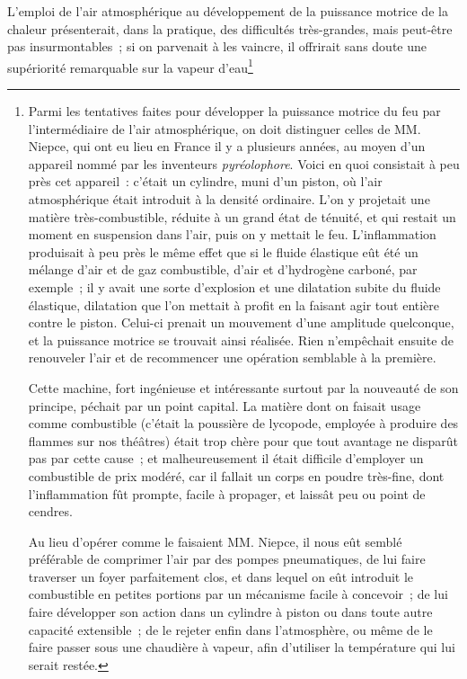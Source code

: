 \documentclass[french,twoside]{book} %
\begin{document}
\noindent L’emploi de l’air atmosphérique au développement de la puissance motrice de la chaleur présenterait, dans la pratique, des difficultés très-grandes, mais peut-être pas insurmontables ; si on parvenait à les vaincre, il offrirait sans doute une supériorité remarquable sur la vapeur d’eau\footnote{ \noindent Parmi les tentatives faites pour développer la puissance motrice du feu par l’intermédiaire de l’air atmosphérique, on doit distinguer celles de MM. Niepce, qui ont eu lieu en France il y a plusieurs années, au moyen d’un appareil nommé par les inventeurs \emph{pyréolophore}. Voici en quoi consistait à peu près cet appareil : c’était un cylindre, muni d’un piston, où l’air atmosphérique était introduit à la densité ordinaire. L’on y projetait une matière très-combustible, réduite à un grand état de ténuité, et qui restait un moment en suspension dans l’air, puis on y mettait le feu. L’inflammation produisait à peu près le même effet que si le fluide élastique eût été un mélange d’air et de gaz combustible, d’air et d’hydrogène carboné, par exemple ; il y avait une sorte d’explosion et une dilatation subite du fluide élastique, dilatation que l’on mettait à profit en la faisant agir tout entière contre le piston. Celui-ci prenait un mouvement d’une amplitude quelconque, et la puissance motrice se trouvait ainsi réalisée. Rien n’empêchait ensuite de renouveler l’air et de recommencer une opération semblable à la première.\par
 Cette machine, fort ingénieuse et intéressante surtout par la nouveauté de son principe, péchait par un point capital. La matière dont on faisait usage comme combustible (c’était la poussière de lycopode, employée à produire des flammes sur nos théâtres) était trop chère pour que tout avantage ne disparût pas par cette cause ; et malheureusement il était difficile d’employer un combustible de prix modéré, car il fallait un corps en poudre très-fine, dont l’inflammation fût prompte, facile à propager, et laissât peu ou point de cendres.\par
 Au lieu d’opérer comme le faisaient MM. Niepce, il nous eût semblé préférable de comprimer l’air par des pompes pneumatiques, de lui faire traverser un foyer parfaitement clos, et dans lequel on eût introduit le combustible en petites portions par un mécanisme facile à concevoir ; de lui faire développer son action dans un cylindre à piston ou dans toute autre capacité extensible ; de le rejeter enfin dans l’atmosphère, ou même de le faire passer sous une chaudière à vapeur, afin d’utiliser la température qui lui serait restée.\par
}
\end{document}
